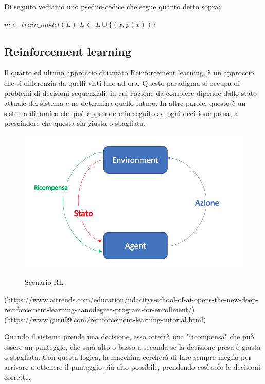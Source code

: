 \documentclass[12pt,italian]{report}
\begin{document}
Di seguito vediamo uno pseduo-codice che segue quanto detto sopra:

\begin{algorithmic}[1]
	\Repeat
	\State $m \gets train\_model(L)$
	\State $L \gets L \cup \{(x, p(x))\}$
	\EndIf
	\EndFor
\end{algorithmic}

\pagebreak
\subsection{Reinforcement learning}
Il quarto ed ultimo approccio chiamato Reinforcement learning, è un approccio che si differenzia da quelli visti fino ad ora. Questo paradigma si occupa di problemi di decisioni sequenziali, in cui l'azione da compiere dipende dallo stato attuale del sistema e ne determina quello futuro. In altre parole, questo è un sistema dinamico che può apprendere in seguito ad ogni decisione presa, a prescindere che questa sia giusta o sbagliata.

\begin{figure}[h!]
	\noindent
	\center
	\label{fig:rl_scenario}
	\includegraphics[scale=0.5]{../img/rl_scenario}
	\caption{Scenario RL}
\end{figure}
 (https://www.aitrends.com/education/udacitys-school-of-ai-opens-the-new-deep-reinforcement-learning-nanodegree-program-for-enrollment/) (https://www.guru99.com/reinforcement-learning-tutorial.html)

Quando il sistema prende una decisione, esso otterrà una "ricompensa" che può essere un punteggio, che sarà alto o basso a seconda se la decisione presa è giusta o sbagliata. Con questa logica, la macchina cercherà di fare sempre meglio per arrivare a ottenere il punteggio più alto possibile, prendendo così solo le decisioni corrette. 
\end{document}
